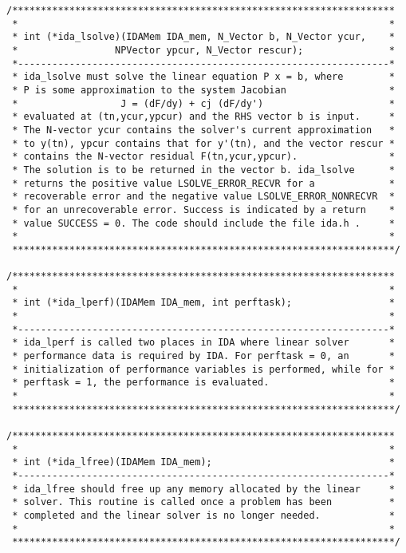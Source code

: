 \documentclass[11pt]{article}
\begin{document}
\begin{verbatim}
/*******************************************************************
 *                                                                 *
 * int (*ida_lsolve)(IDAMem IDA_mem, N_Vector b, N_Vector ycur,    *
 *                 NPVector ypcur, N_Vector rescur);               *
 *-----------------------------------------------------------------*
 * ida_lsolve must solve the linear equation P x = b, where        *
 * P is some approximation to the system Jacobian                  *
 *                  J = (dF/dy) + cj (dF/dy')                      *
 * evaluated at (tn,ycur,ypcur) and the RHS vector b is input.     *
 * The N-vector ycur contains the solver's current approximation   *
 * to y(tn), ypcur contains that for y'(tn), and the vector rescur *
 * contains the N-vector residual F(tn,ycur,ypcur).                *
 * The solution is to be returned in the vector b. ida_lsolve      *
 * returns the positive value LSOLVE_ERROR_RECVR for a             *
 * recoverable error and the negative value LSOLVE_ERROR_NONRECVR  *
 * for an unrecoverable error. Success is indicated by a return    *
 * value SUCCESS = 0. The code should include the file ida.h .     *
 *                                                                 *
 *******************************************************************/

/*******************************************************************
 *                                                                 *
 * int (*ida_lperf)(IDAMem IDA_mem, int perftask);                 *
 *                                                                 *
 *-----------------------------------------------------------------*
 * ida_lperf is called two places in IDA where linear solver       *
 * performance data is required by IDA. For perftask = 0, an       *
 * initialization of performance variables is performed, while for *
 * perftask = 1, the performance is evaluated.                     *
 *                                                                 *
 *******************************************************************/

/*******************************************************************
 *                                                                 *
 * int (*ida_lfree)(IDAMem IDA_mem);                               *
 *-----------------------------------------------------------------*
 * ida_lfree should free up any memory allocated by the linear     *
 * solver. This routine is called once a problem has been          *
 * completed and the linear solver is no longer needed.            *
 *                                                                 *
 *******************************************************************/

\end{verbatim}
\normalsize
\end{document}
